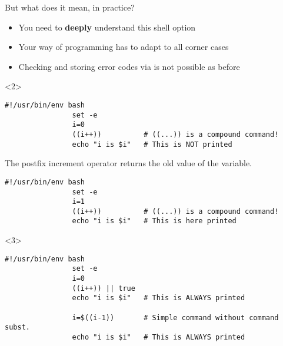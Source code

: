 \begin{frame}[fragile]{But what does it mean, in practice?}
    \vspace{-1mm}
    \begin{overlayarea}{\textwidth}{0.7\textheight}
        \begin{itemize}
            \setlength{\itemsep}{0pt}
            \item \alert<2>{You need to \textbf{deeply} understand this shell option}
            \item \alert<3-4>{Your way of programming has to adapt to all corner cases}
            \item \alert<5>{Checking and storing error codes via  is not possible as before}
        \end{itemize}
        \vspace{2mm}
        \begin{onlyenv}<2>
            \begin{lstlisting}[style=myBash]
                #!/usr/bin/env bash
                set -e
                i=0
                ((i++))          # ((...)) is a compound command!
                echo "i is $i"   # This is NOT printed
            \end{lstlisting}
            \centerline{\tiny The postfix increment operator returns the old value of the variable.}
            \begin{lstlisting}[style=myBash, aboveskip=2mm]
                #!/usr/bin/env bash
                set -e
                i=1
                ((i++))          # ((...)) is a compound command!
                echo "i is $i"   # This is here printed
            \end{lstlisting}
        \end{onlyenv}
        \begin{onlyenv}<3>
            \begin{lstlisting}[style=myBash]
                #!/usr/bin/env bash
                set -e
                i=0
                ((i++)) || true
                echo "i is $i"   # This is ALWAYS printed

                i=$((i-1))       # Simple command without command subst.
                echo "i is $i"   # This is ALWAYS printed


\end{lstlisting}
\end{onlyenv}
\end{overlayarea}
\end{frame}
